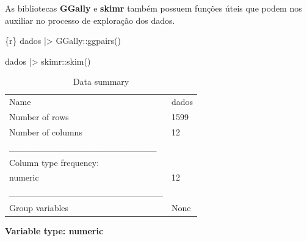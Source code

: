 \documentclass[
  letterpaper,
  DIV=11,
  numbers=noendperiod,
  oneside]{scrartcl}
\newenvironment{Shaded}{\begin{snugshade}}{\end{snugshade}}
\newcommand{\FunctionTok}[1]{\textcolor[rgb]{0.28,0.35,0.67}{#1}}
\newcommand{\InformationTok}[1]{\textcolor[rgb]{0.37,0.37,0.37}{#1}}
\newcommand{\NormalTok}[1]{\textcolor[rgb]{0.00,0.23,0.31}{#1}}
\newcommand{\SpecialCharTok}[1]{\textcolor[rgb]{0.37,0.37,0.37}{#1}}
\begin{document}
As bibliotecas \textbf{GGally} e \textbf{skimr} também possuem funções
úteis que podem nos auxiliar no processo de exploração dos dados.

\begin{Shaded}
\begin{Highlighting}[]
\InformationTok{\textasciigrave{}\textasciigrave{}\textasciigrave{}\{r\}}
\NormalTok{dados }\SpecialCharTok{|\textgreater{}} 
\NormalTok{  GGally}\SpecialCharTok{::}\FunctionTok{ggpairs}\NormalTok{()}

\NormalTok{dados }\SpecialCharTok{|\textgreater{}} 
\NormalTok{  skimr}\SpecialCharTok{::}\FunctionTok{skim}\NormalTok{()}
\InformationTok{\textasciigrave{}\textasciigrave{}\textasciigrave{}}
\end{Highlighting}
\end{Shaded}

\begin{longtable}[]{@{}ll@{}}
\caption{Data summary}\tabularnewline
\toprule\noalign{}
\endfirsthead
\endhead
\bottomrule\noalign{}
\endlastfoot
Name & dados \\
Number of rows & 1599 \\
Number of columns & 12 \\
\_\_\_\_\_\_\_\_\_\_\_\_\_\_\_\_\_\_\_\_\_\_\_ & \\
Column type frequency: & \\
numeric & 12 \\
\_\_\_\_\_\_\_\_\_\_\_\_\_\_\_\_\_\_\_\_\_\_\_\_ & \\
Group variables & None \\
\end{longtable}

\textbf{Variable type: numeric}
\end{document}
